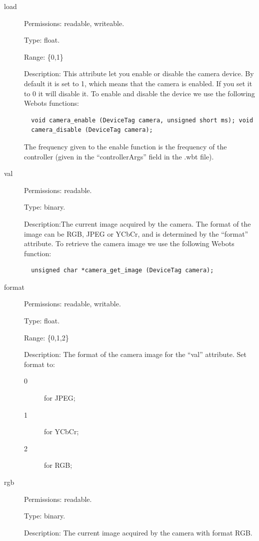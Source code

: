 \noindent
\begin{description}
\item[{load}] Permissions: readable, writeable.


  Type: float.


  Range: \{0,1\}


  Description: This attribute let you enable or disable the camera
  device.  By default it is set to 1, which means that the camera is
  enabled. If you set it to 0 it will disable it.  To enable and
  disable the device we use the following Webots functions:


\begin{lstlisting}
  void camera_enable (DeviceTag camera, unsigned short ms); void
  camera_disable (DeviceTag camera);
\end{lstlisting}

The frequency given to the enable function is the frequency of the
\urbi controller (given in the ``controllerArgs'' field in the .wbt
file).

\item[{val}] Permissions: readable.


  Type: binary.


  Description:The current image acquired by the camera. The format of
  the image can be RGB, JPEG or YCbCr, and is determined by the
  ``format'' attribute.  To retrieve the camera image we use the
  following Webots function:


\begin{lstlisting}
  unsigned char *camera_get_image (DeviceTag camera);
\end{lstlisting}
\item[{format}] Permissions: readable, writable.


  Type: float.


  Range: \{0,1,2\}


  Description: The format of the camera image for the ``val''
  attribute. Set format to:

  \begin{description}
  \item[0] for JPEG;
  \item[1] for YCbCr;
  \item[2] for RGB;
  \end{description}

\item[{rgb}] Permissions: readable.


  Type: binary.


  Description: The current image acquired by the camera with format
  RGB.


\end{description}
